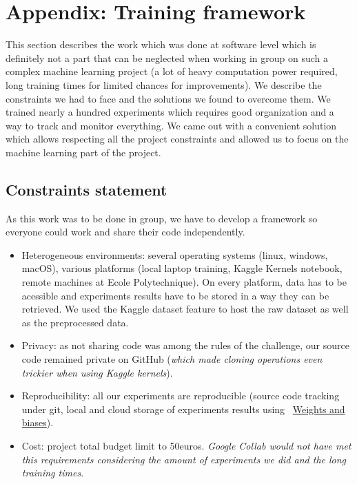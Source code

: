\clearpage
\section{Appendix: Training framework}
\label{sec:training_fwk}
This section describes the work which was done at software level which is definitely not a part that can be neglected when working in group on such a complex machine learning project (a lot of heavy computation power required, long training times for limited chances for improvements).  We describe the constraints we had to face and the solutions we found to overcome them. We trained nearly a hundred experiments which requires good organization and a way to track and monitor everything.
We came out with a convenient solution which allows respecting all the project constraints and allowed us to focus on the machine learning part of the project.

\subsection*{Constraints statement}
\label{sec:Constraints}
As this work was to  be done in group, we have to develop a framework so everyone could work and share their code independently.
\begin{itemize}
    \item Heterogeneous environments: several operating systems (linux, windows, macOS), various platforms (local laptop training, Kaggle Kernels notebook, remote machines at Ecole Polytechnique). On every platform, data has to be acessible and experiments results have to be stored in a way they can be retrieved. We used the Kaggle dataset feature to  host the raw dataset as well as the preprocessed data.
    \item Privacy: as not sharing code was among the rules of the challenge, our source code remained private on GitHub (\textit{which made cloning operations even trickier when using Kaggle kernels}).
    \item Reproducibility: all our experiments are reproducible (source code tracking under git, local and cloud storage of experiments results using ~\href{https://wandb.ai/molecule-nlp-altegrad-23/molecule-nlp}{Weights and biases}).
    \item Cost: project total budget limit to 50euros. \textit{Google Collab would not have met this requirements considering the amount of experiments we did and the long training times}.
\end{itemize}


